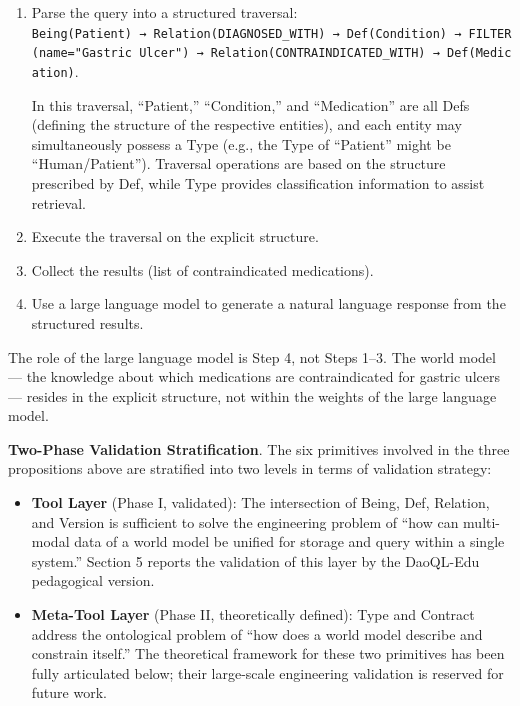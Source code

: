 \documentclass[11pt,a4paper]{article}
\begin{document}
\begin{enumerate}
\def\labelenumi{\arabic{enumi}.}
\item
  Parse the query into a structured traversal:
  \texttt{Being(Patient)\ →\ Relation(DIAGNOSED\_WITH)\ →\ Def(Condition)\ →\ FILTER(name="Gastric\ Ulcer")\ →\ Relation(CONTRAINDICATED\_WITH)\ →\ Def(Medication)}.

  In this traversal, ``Patient,'' ``Condition,'' and ``Medication'' are
  all Defs (defining the structure of the respective entities), and each
  entity may simultaneously possess a Type (e.g., the Type of
  ``Patient'' might be ``Human/Patient''). Traversal operations are
  based on the structure prescribed by Def, while Type provides
  classification information to assist retrieval.
\item
  Execute the traversal on the explicit structure.
\item
  Collect the results (list of contraindicated medications).
\item
  Use a large language model to generate a natural language response
  from the structured results.
\end{enumerate}

The role of the large language model is Step 4, not Steps 1--3. The
world model --- the knowledge about which medications are
contraindicated for gastric ulcers --- resides in the explicit
structure, not within the weights of the large language model.

\textbf{Two-Phase Validation Stratification}. The six primitives
involved in the three propositions above are stratified into two levels
in terms of validation strategy:

\begin{itemize}
\tightlist
\item
  \textbf{Tool Layer} (Phase I, validated): The intersection of Being,
  Def, Relation, and Version is sufficient to solve the engineering
  problem of ``how can multi-modal data of a world model be unified for
  storage and query within a single system.'' Section 5 reports the
  validation of this layer by the DaoQL-Edu pedagogical version.
\item
  \textbf{Meta-Tool Layer} (Phase II, theoretically defined): Type and
  Contract address the ontological problem of ``how does a world model
  describe and constrain itself.'' The theoretical framework for these
  two primitives has been fully articulated below; their large-scale
  engineering validation is reserved for future work.
\end{itemize}
\end{document}

